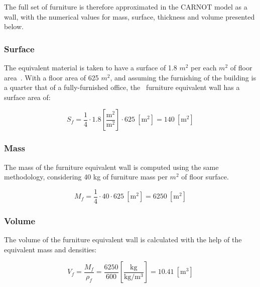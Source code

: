 The full set of furniture is therefore approximated in the CARNOT model as a
wall, with the numerical values for mass, surface, thickness and volume
presented below.

\subsubsection*{Surface}

The equivalent material is taken to have a surface of 1.8 $m^2$ per each $m^2$
of floor area~\cite{johraNumericalAnalysisImpact2017}. With a floor area of 625
$m^2$, and assuming the furnishing of the building is a quarter that of a
fully-furnished office, the \pdome\ furniture equivalent wall has a surface area
of:

\begin{equation}
    S_f = \frac{1}{4} \cdot 1.8 \left[\frac{\text{m}^2}{\text{m}^2}\right]
    \cdot 625\ \left[\text{m}^2\right] = 140\ \left[\text{m}^2\right]
\end{equation}

\subsubsection*{Mass}

The mass of the furniture equivalent wall is computed using the same
methodology, considering 40 kg of furniture mass per $m^2$ of floor surface.

\begin{equation}
    M_f = \frac{1}{4} \cdot 40 \cdot 625\ \left[\text{m}^2\right] = 6250\
    \left[\text{m}^2\right]
\end{equation}

\subsubsection*{Volume}

The volume of the furniture equivalent wall is calculated with the help of the
equivalent mass and densities:

\begin{equation}
    V_f = \frac{M_f}{\rho_f} = \frac{6250}{600}
    \left[\frac{\text{kg}}{\text{kg}/\text{m}^3}\right]
    = 10.41\ \left[\text{m}^3\right]
\end{equation}

